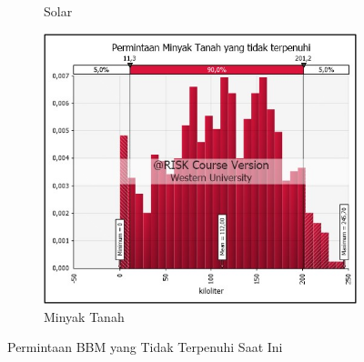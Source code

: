 \begin{figure}[!ht]
\begin{subfigure}{0.48\textwidth}
        \caption{Solar}
        \label{fig:minus-solar-saat-ini}
    \end{subfigure}
    
    \vspace{1cm}  %
    
    \begin{subfigure}{0.5\textwidth}
        \centering
        \includegraphics[width=\textwidth]{grafik/minus-mt-saat-ini.jpg}
        \caption{Minyak Tanah}
        \label{fig:minus-mt-saat-ini}
    \end{subfigure}
    \caption{Permintaan BBM yang Tidak Terpenuhi Saat Ini}
    \label{fig:minus-bbm-saat-ini}
\end{figure}

